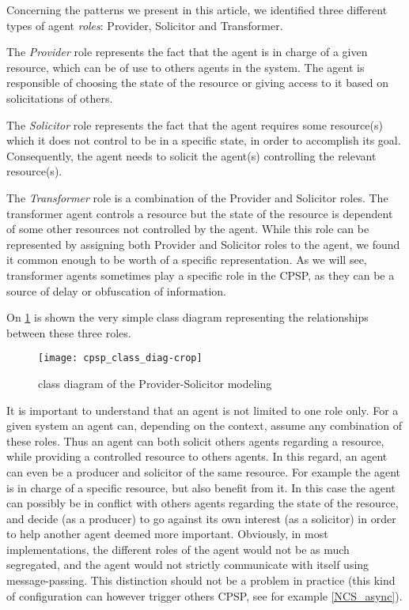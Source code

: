 Concerning the patterns we present in this article, we identified three different types of agent \emph{roles}: Provider, Solicitor and Transformer.

The \emph{Provider} role represents the fact that the agent is in charge of a given resource, which can be of use to others agents in the system. The agent is responsible of choosing the state of the resource or giving access to it based on solicitations of others.

The \emph{Solicitor} role represents the fact that the agent requires some resource(s) which it does not control to be in a specific state, in order to accomplish its goal. Consequently, the agent needs to solicit the agent(s) controlling the relevant resource(s).

The \emph{Transformer} role is a combination of the Provider and Solicitor roles. The transformer agent controls a resource but the state of the resource is dependent of some other resources not controlled by the agent. While this role can be represented by assigning both Provider and Solicitor roles to the agent, we found it common enough to be worth of a specific representation. As we will see, transformer agents sometimes play a specific role in the CPSP, as they can be a source of delay or obfuscation of information.

On \figurename{} \ref{cpsp_class_diag} is shown the very simple class diagram representing the relationships between these three roles.

\begin{figure}
\centering
\texttt{[image: cpsp\_class\_diag-crop]}
\caption{class diagram of the Provider-Solicitor modeling}
\label{cpsp_class_diag}
\end{figure}

It is important to understand that an agent is not limited to one role only. For a given system an agent can, depending on the context, assume any combination of these roles. Thus an agent can both solicit others agents regarding a resource, while providing a controlled resource to others agents.
In this regard, an agent can even be a producer and solicitor of the same resource. For example the agent is in charge of a specific resource, but also benefit from it. In this case the agent can possibly be in conflict with others agents regarding the state of the resource, and decide (as a producer) to go against its own interest (as a solicitor) in order to help another agent deemed more important.
Obviously, in most implementations, the different roles of the agent would not be as much segregated, and the agent would not strictly communicate with itself using message-passing. This distinction should not be a problem in practice (this kind of configuration can however trigger others CPSP, see for example \ref{NCS_async}).


